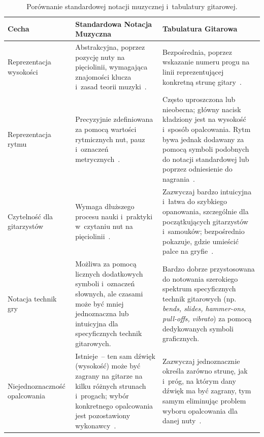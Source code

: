 \begin{table}[H]
    \centering
    \caption{Porównanie standardowej notacji muzycznej i~tabulatury gitarowej.}
    \label{tab:porownanie_notacji_latex}
    \begin{tabular}{|p{}|p{}|p{}|}
        \hline
        \textbf{Cecha} & \textbf{Standardowa Notacja Muzyczna} & \textbf{Tabulatura Gitarowa} \\
        \hline
        Reprezentacja wysokości & Abstrakcyjna, poprzez pozycję nuty na pięciolinii, wymagająca znajomości klucza i~zasad teorii muzyki~\autocite{Wiggins2019TabCNN}.
        & Bezpośrednia, poprzez wskazanie numeru progu na linii reprezentującej konkretną strunę gitary~\autocite{Wiggins2019TabCNN}.
        \\
        \hline
        Reprezentacja rytmu & Precyzyjnie zdefiniowana za pomocą wartości rytmicznych nut, pauz i~oznaczeń metrycznych~\autocite{Wiggins2019TabCNN}.
        & Często uproszczona lub nieobecna; główny nacisk kładziony jest na wysokość i~sposób opalcowania. Rytm bywa jednak dodawany za pomocą symboli podobnych do notacji standardowej lub poprzez odniesienie do nagrania~\autocite{Wiggins2019TabCNN}.
        \\
        \hline
        Czytelność dla gitarzystów & Wymaga dłuższego procesu nauki i~praktyki w~czytaniu nut na pięciolinii~\autocite{Wiggins2019TabCNN}.
        & Zazwyczaj bardzo intuicyjna i~łatwa do szybkiego opanowania, szczególnie dla początkujących gitarzystów i~samouków; bezpośrednio pokazuje, gdzie umieścić palce na gryfie~\autocite{Wiggins2019TabCNN}. \\
        \hline
        Notacja technik gry & Możliwa za pomocą licznych dodatkowych symboli i~oznaczeń słownych, ale czasami może być mniej jednoznaczna lub intuicyjna dla specyficznych technik gitarowych.
        & Bardzo dobrze przystosowana do notowania szerokiego spektrum specyficznych technik gitarowych (np. \textit{bends, slides, hammer-ons, pull-offs, vibrato}) za pomocą dedykowanych symboli graficznych.
        \\
        \hline
        Niejednoznaczność opalcowania & Istnieje~– ten sam dźwięk (wysokość) może być zagrany na gitarze na kilku różnych strunach i~progach; wybór konkretnego opalcowania jest pozostawiony wykonawcy~\autocite{Wiggins2019TabCNN}. & Zazwyczaj jednoznacznie określa zarówno strunę, jak i~próg, na którym dany dźwięk ma być zagrany, tym samym eliminując problem wyboru opalcowania dla danej nuty~\autocite{Wiggins2019TabCNN}.
        \\
        \hline
    \end{tabular}
\end{table}

